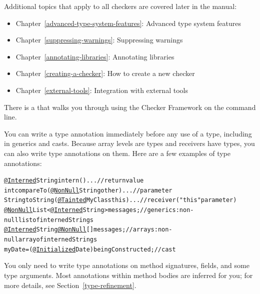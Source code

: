 Additional topics that apply to all checkers are covered later in the manual:
\begin{itemize}
\item Chapter~\ref{advanced-type-system-features}: Advanced type system features
\item Chapter~\ref{suppressing-warnings}: Suppressing warnings
\item Chapter~\ref{annotating-libraries}: Annotating libraries
\item Chapter~\ref{creating-a-checker}: How to create a new checker
\item Chapter~\ref{external-tools}: Integration with external tools
\end{itemize}


There is a
that walks you through using the Checker Framework on the
command line.




You can write a type annotation immediately before any
use of a type, including in generics and casts.  Because array levels are
types and receivers have types, you can also write type annotations on
them.  Here are a few examples of type annotations:

\begin{smaller}
\begin{alltt}
  \underline{@Interned} String intern() \ttlcb{} ... \ttrcb{}               // return value
  int compareTo(\underline{@NonNull} String other) \ttlcb{} ... \ttrcb{}    // parameter
  String toString(\underline{@Tainted} MyClass this) \ttlcb{} ... \ttrcb{}  // receiver ("this" parameter)
  \underline{@NonNull} List<\underline{@Interned} String> messages;       // generics:  non-null list of interned Strings
  \underline{@Interned} String \underline{@NonNull} [] messages;          // arrays:  non-null array of interned Strings
  myDate = (\underline{@Initialized} Date) beingConstructed;  // cast
\end{alltt}
\end{smaller}

You only need to write type annotations on method signatures, fields, and some type arguments.
Most annotations within method bodies are inferred for you; for more details,
see Section~\ref{type-refinement}.

